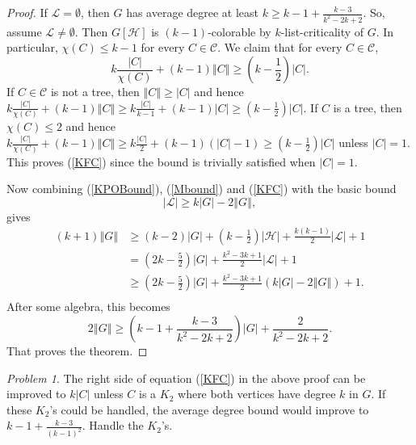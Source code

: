 \documentclass[12pt]{article}
\theoremstyle{plain}
\theoremstyle{definition}
\theoremstyle{remark}
\newtheorem*{problem}{Problem}
\newcommand{\fancy}[1]{\mathcal{#1}}
\newcommand{\C}[1]{\fancy{C}_{#1}}
\renewcommand{\L}{\fancy{L}}
\newcommand{\HH}{\fancy{H}}
\newcommand{\card}[1]{\left|#1\right|}
\newcommand{\size}[1]{\left\Vert#1\right\Vert}
\newcommand{\parens}[1]{\left( #1 \right)}
\def\C{\fancy{C}}
\begin{document}
\begin{proof}
	If $\L = \emptyset$, then $G$ has average degree at least $k \ge k-1 + \frac{k-3}{k^2-2k+2}$.  So, assume $\L \ne \emptyset$.  Then $G[\HH]$ is $(k-1)$-colorable by $k$-list-criticality of $G$. In particular, $\chi(C) \le k-1$ for every $C \in \C$.
	We claim that for every $C \in \C$,
	\begin{equation}
	 k\frac{\card{C}}{\chi(C)} + (k-1)\size{C} \ge \parens{k - \frac12}\card{C}.
	 \label{KFC}
	\end{equation}
	If $C \in \C$ is not a tree, then $\size{C} \ge \card{C}$ and hence $k\frac{\card{C}}{\chi(C)} + (k-1)\size{C} \ge k\frac{\card{C}}{k-1} + (k-1)\card{C} \ge (k - \frac12)\card{C}$.  If $C$ is a tree, then $\chi(C) \le 2$ and hence 
	$k\frac{\card{C}}{\chi(C)} + (k-1)\size{C} \ge k\frac{\card{C}}{2} + (k-1)(\card{C} - 1) \ge (k-\frac12)\card{C}$ unless $\card{C} = 1$.  This proves (\ref{KFC}) since the bound is trivially satisfied when $\card{C} = 1$.
	
	Now combining (\ref{KPOBound}), (\ref{Mbound}) and (\ref{KFC}) with the basic bound
	\begin{equation*}
	  \card{\L} \ge k\card{G} - 2\size{G},
	\end{equation*}	
	gives
	\begin{align*}
	(k+1)\size{G} &\ge (k-2)\card{G} + \parens{k - \frac12}\card{\HH} + \frac{k(k-1)}{2}\card{\L} + 1\\
	&= \parens{2k-\frac52}\card{G} + \frac{k^2 - 3k + 1}{2}\card{\L} + 1\\
	&\ge\parens{2k-\frac52}\card{G} + \frac{k^2 - 3k + 1}{2}\parens{k\card{G} - 2\size{G}} + 1.\\
	\end{align*}
	After some algebra, this becomes
	\begin{equation*}
		2\size{G} \ge \parens{k-1 + \frac{k-3}{k^2 -2k + 2}}\card{G} + \frac{2}{k^2 -2k + 2}.
	\end{equation*}
	That proves the theorem.
\end{proof}



\begin{problem}
The right side of equation (\ref{KFC}) in the above proof can be improved to $k\card{C}$ unless $C$ is a $K_2$ where both vertices have degree $k$ in $G$.  If these $K_2$'s could be handled, the average degree bound would improve to $k-1 + \frac{k-3}{(k-1)^2}$.  Handle the $K_2$'s.
\end{problem}



\end{document}
